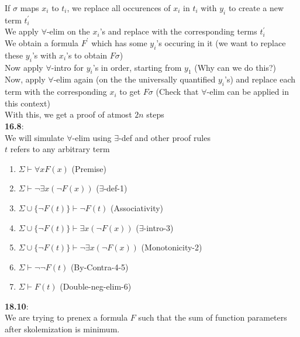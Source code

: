 \documentclass{article}
\begin{document}
\begin{flushleft}
If $\sigma$ maps $x_i$ to $t_i$, we replace all occurences of $x_i$ in $t_i$ with $y_i$ to create a new term $t_i^{'}$\\
We apply $\forall$-elim on the $x_i$'s and replace with the corresponding terms $t_i^{'}$\\
We obtain a formula $F^{'}$ which has some $y_i$'s occuring in it (we want to replace these $y_i$'s with $x_i$'s to obtain $F\sigma$)\\
Now apply $\forall$-intro for $y_i$'s in order, starting from $y_1$ (Why can we do this?)\\
Now, apply $\forall$-elim again (on the the universally quantified $y_i$'s) and replace each term with the corresponding $x_i$ to get $F\sigma$ (Check that $\forall$-elim can be applied in this context)\\
With this, we get a proof of atmost $2n$ steps\\
\textbf{16.8}: \\
We will simulate $\forall$-elim using $\exists$-def and other proof rules\\
$t$ refers to any arbitrary term \\
\begin{enumerate}
    \item $\Sigma \vdash \forall x F(x)$ \hspace{2mm} (Premise)
    \item $\Sigma \vdash \neg \exists x (\neg F(x))$ \hspace{2mm} ($\exists$-def-1)
    \item $\Sigma \cup \{{\neg F(t)}\} \vdash \neg F(t)$ \hspace{2mm} (Associativity)
    \item $\Sigma \cup \{{\neg F(t)}\} \vdash \exists x (\neg F(x))$ \hspace{2mm} ($\exists$-intro-3)
    \item $\Sigma \cup \{{\neg F(t)}\} \vdash \neg \exists x(\neg F(x))$ \hspace{2mm} (Monotonicity-2)
    \item $\Sigma \vdash \neg \neg F(t)$  \hspace{2mm} (By-Contra-4-5)
    \item  $\Sigma \vdash F(t)$  \hspace{2mm} (Double-neg-elim-6)
\end{enumerate}
\textbf{18.10}: \\
We are trying to prenex a formula $F$ such that the sum of function parameters after skolemization is minimum.\\

\end{flushleft}
\end{document}
